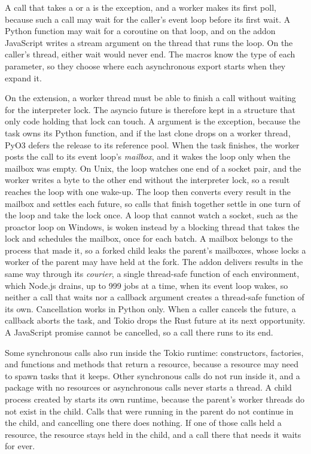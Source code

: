 \documentclass[sigconf,nonacm]{acmart}
\begin{document}
A call that takes a  or a  is the exception, and a worker makes its first poll, because such a call may wait for the caller's event loop before its first wait. A Python function may wait for a coroutine on that loop, and on the addon JavaScript writes a stream argument on the thread that runs the loop. On the caller's thread, either wait would never end. The macros know the type of each parameter, so they choose where each asynchronous export starts when they expand it.

On the extension, a worker thread must be able to finish a call without waiting for the interpreter lock. The asyncio future is therefore kept in a structure that only code holding that lock can touch. A  argument is the exception, because the task owns its Python function, and if the last clone drops on a worker thread, PyO3 defers the release to its reference pool. When the task finishes, the worker posts the call to its event loop's \emph{mailbox}, and it wakes the loop only when the mailbox was empty. On Unix, the loop watches one end of a socket pair, and the worker writes a byte to the other end without the interpreter lock, so a result reaches the loop with one wake-up. The loop then converts every result in the mailbox and settles each future, so calls that finish together settle in one turn of the loop and take the lock once. A loop that cannot watch a socket, such as the proactor loop on Windows, is woken instead by a blocking thread that takes the lock and schedules the mailbox, once for each batch. A mailbox belongs to the process that made it, so a forked child leaks the parent's mailboxes, whose locks a worker of the parent may have held at the fork. The addon delivers results in the same way through its \emph{courier}, a single thread-safe function of each environment, which Node.js drains, up to 999 jobs at a time, when its event loop wakes, so neither a call that waits nor a callback argument creates a thread-safe function of its own. Cancellation works in Python only. When a caller cancels the future, a callback aborts the task, and Tokio drops the Rust future at its next opportunity. A JavaScript promise cannot be cancelled, so a call there runs to its end.

Some synchronous calls also run inside the Tokio runtime: constructors, factories, and functions and methods that return a resource, because a resource may need to spawn tasks that it keeps. Other synchronous calls do not run inside it, and a package with no resources or asynchronous calls never starts a thread. A child process created by  starts its own runtime, because the parent's worker threads do not exist in the child. Calls that were running in the parent do not continue in the child, and cancelling one there does nothing. If one of those calls held a resource, the resource stays held in the child, and a call there that needs it waits for ever.
\end{document}
